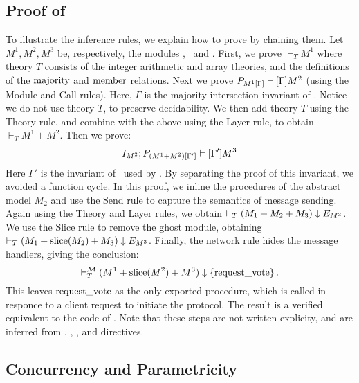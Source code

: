 \subsection{Proof of \Toy}

To illustrate the inference rules, we explain how to prove {\Toy} by chaining them.
Let $M^1,M^2,M^3$ be, respectively, the modules \mnodeset, \mtoyprotocol\ and \mtoysystem.
First, we prove $\vdash_T M^1$ where theory $T$ consists of
the integer arithmetic and array theories, and the definitions of the
$\rmajority$ and $\rmember$ relations. Next we prove $P_{\PostAssume{M^1}{\Gamma}} \vdash \PreAssume{M^2}{\Gamma}$ (using the Module and Call rules). Here, $\Gamma$ is the majority intersection invariant of \mnodeset. Notice we do not use theory $T$, to preserve decidability. We then add theory $T$ using the
Theory rule, and combine with the above using the Layer rule, to obtain $\vdash_T M^1 + M^2$. Then we prove:
\[ I_{M^2};P_{\PostAssume{(M^1+M^2)}{\Gamma'}} \vdash \PreAssume{M^3}{\Gamma'} \]
Here $\Gamma'$ is the invariant of \mtoyprotocol\ used by \mtoysystem. By separating
the proof of this invariant, we avoided a function cycle.
In this proof, we inline the procedures of the abstract model $M_2$ and use the Send rule to capture
the semantics of message sending. Again using the Theory and Layer rules, we obtain
$\vdash_T (M_1 + M_2 + M_3) \Restr E_{M^3}$. We use the Slice rule to remove the ghost module,
obtaining $\vdash_T (M_1 + \Slice{M_2} + M_3) \Restr E_{M^3}$.
Finally, the network rule hides the message handlers, giving the conclusion:
\[\vdash^{\Msgs}_T (M^1 + \Slice{M^2} + M^3) \Restr \left\{ \prequestvote \right\}.\]
This leaves $\prequestvote$ as the only exported procedure, which is
called in responce to a client request to initiate the protocol. The
result is a verified equivalent to the code of .
%
Note that these steps are not written explicity, and are inferred
from , , , and 
directives.
%


\subsection{Concurrency and Parametricity}

